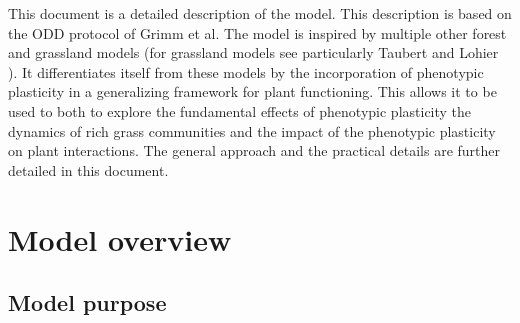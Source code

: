

\begin{fullwidth}
\noindent
This document is a detailed description of the \model model. This description is based on the ODD protocol of Grimm et al. The model is inspired by multiple other forest and grassland models (for grassland models see particularly Taubert \parencite{taubert_modelling_2014} and Lohier \parencite{lohier_explaining_2014}). It differentiates itself from these models by the incorporation of phenotypic plasticity in a generalizing framework for plant functioning. This allows it to be used to both to explore the fundamental effects of phenotypic plasticity the dynamics of rich grass communities and the impact of the phenotypic plasticity on plant interactions. The general approach and the practical details are further detailed in this document.
\end{fullwidth}



\section{Model overview}

\subsection{Model purpose}

